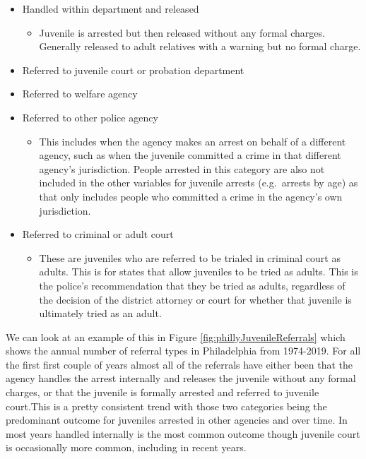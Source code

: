 \documentclass[
  12pt,
  openany]{book}
\providecommand{\tightlist}{%
  \setlength{\itemsep}{0pt}\setlength{\parskip}{0pt}}
\begin{document}
\begin{itemize}
\tightlist
\item
  Handled within department and released

  \begin{itemize}
  \tightlist
  \item
    Juvenile is arrested but then released without any formal charges. Generally released to adult relatives with a warning but no formal charge.
  \end{itemize}
\item
  Referred to juvenile court or probation department
\item
  Referred to welfare agency
\item
  Referred to other police agency

  \begin{itemize}
  \tightlist
  \item
    This includes when the agency makes an arrest on behalf of a different agency, such as when the juvenile committed a crime in that different agency's jurisdiction. People arrested in this category are also not included in the other variables for juvenile arrests (e.g.~arrests by age) as that only includes people who committed a crime in the agency's own jurisdiction.
  \end{itemize}
\item
  Referred to criminal or adult court

  \begin{itemize}
  \tightlist
  \item
    These are juveniles who are referred to be trialed in criminal court as adults. This is for states that allow juveniles to be tried as adults. This is the police's recommendation that they be tried as adults, regardless of the decision of the district attorney or court for whether that juvenile is ultimately tried as an adult.
  \end{itemize}
\end{itemize}

We can look at an example of this in Figure \ref{fig:phillyJuvenileReferrals} which shows the annual number of referral types in Philadelphia from 1974-2019. For all the first first couple of years almost all of the referrals have either been that the agency handles the arrest internally and releases the juvenile without any formal charges, or that the juvenile is formally arrested and referred to juvenile court.This is a pretty consistent trend with those two categories being the predominant outcome for juveniles arrested in other agencies and over time. In most years handled internally is the most common outcome though juvenile court is occasionally more common, including in recent years.
\end{document}
